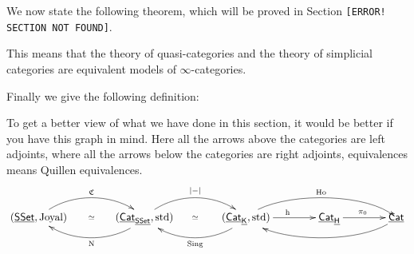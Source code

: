 We now state the following theorem, which will be proved in Section {\color{red}\texttt{[ERROR! SECTION NOT FOUND]}}.


This means that the theory of quasi-categories and the theory of simplicial categories are equivalent models of $\infty$-categories.

Finally we give the following definition:


To get a better view of what we have done in this section, it would be better if you have this graph in mind. Here all the arrows
above the categories are left adjoints, where all the arrows below the categories are right adjoints, equivalences
means Quillen equivalences.
$$\xymatrix @C=40pt{
    (\cat{SSet},\text{Joyal})\ar@(ru,lu)[r]^{\C}\ar@{}[r]|{\simeq}
    &(\cat{Cat}_{\cat{SSet}},\text{std})\ar@(ld,rd)[l]^{\N}\ar@(ru,lu)[r]^{\abs-}\ar@{}[r]|{\simeq}
    &(\cat{Cat}_{\cat{K}},\text{std})\ar@(ld,rd)[l]^{\Sing}\ar[r]^{\h}\ar@(ru,lu)[rr]^{\Ho}
    &\cat{Cat}_{\cat H}\ar[r]^{\pi_0}
    &\cat{Cat}\ar@(ld,rd)[ll]
}$$